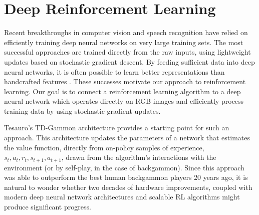 \documentclass{article} %
\begin{document}





\section{Deep Reinforcement Learning}
\label{sec:method}

Recent breakthroughs in computer vision and speech recognition have relied on efficiently training deep neural networks on very large training sets.
The most successful approaches are trained directly from the raw inputs, using lightweight updates based on stochastic gradient descent. By feeding sufficient data into deep neural networks, it is often possible to learn better representations than handcrafted features \cite{krizhevsky-imagenet}. These successes motivate our approach to reinforcement learning. Our goal is to connect a reinforcement learning algorithm to a deep neural network which operates directly on RGB images and efficiently process training data by using stochastic gradient updates. 

Tesauro's TD-Gammon architecture provides a starting point for such an approach. This architecture updates the parameters of a network that estimates the value function, directly from on-policy samples of experience, $s_t, a_t, r_t, s_{t+1}, a_{t+1}$, drawn from the algorithm's interactions with the environment (or by self-play, in the case of backgammon). Since this approach was able to outperform the best human backgammon players 20 years ago, it is natural to wonder whether two decades of hardware improvements, coupled with modern deep neural network architectures and scalable RL algorithms might produce significant progress. 
\end{document}
